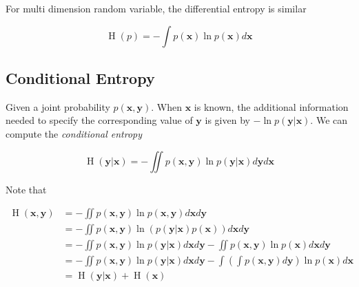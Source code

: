 \documentclass{article}
\begin{document}
            For multi dimension random variable, the differential entropy is similar

            \begin{equation*}
                \operatorname{H}(p) = - \int p(\mathbf{x}) \ln p(\mathbf{x}) d \mathbf{x} 
            \end{equation*}

        \subsection{Conditional Entropy}

            Given a joint probability $ p(\mathbf{x}, \mathbf{y}) $. When $
            \mathbf{x} $ is known, the additional information needed to specify
            the corresponding value of $ \mathbf{y} $ is given by $ - \ln
            p(\mathbf{y} | \mathbf{x}) $. We can compute the \textit{conditional entropy}

            \begin{equation*}
                \operatorname{H}(\mathbf{y} | \mathbf{x}) = 
                 - \iint p(\mathbf{x}, \mathbf{y}) \ln p( \mathbf{y} | \mathbf{x} ) d \mathbf{y} d \mathbf{x}
            \end{equation*}

            Note that

            \begin{align*}
                \operatorname{H}(\mathbf{x}, \mathbf{y})
                      &= - \iint p(\mathbf{x}, \mathbf{y})
                         \ln p(\mathbf{x}, \mathbf{y}) d \mathbf{x} d \mathbf{y} \\
                      &= - \iint p(\mathbf{x}, \mathbf{y}) 
                         \ln ( p(\mathbf{y} | \mathbf{x}) p(\mathbf{x})) d \mathbf{x} d \mathbf{y} \\
                      &= - \iint p(\mathbf{x}, \mathbf{y}) \ln p(\mathbf{y} | \mathbf{x}) d \mathbf{x}
                          d \mathbf{y} - \iint p(\mathbf{x}, \mathbf{y}) \ln p(\mathbf{x}) d \mathbf{x}
                          d \mathbf{y} \\
                      &= - \iint p(\mathbf{x}, \mathbf{y}) \ln p(\mathbf{y} | \mathbf{x}) d \mathbf{x}
                          d \mathbf{y} - \int \left( \int p(\mathbf{x}, \mathbf{y}) d \mathbf{y} \right)
                          \ln p(\mathbf{x}) d \mathbf{x} \\
                      &= \operatorname{H} (\mathbf{y} | \mathbf{x}) + \operatorname{H} (\mathbf{x})
            \end{align*}
\end{document}
